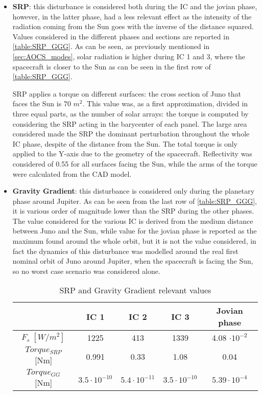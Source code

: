 \begin{itemize}
    \item \textbf{SRP}: this disturbance is considered both during the IC and the jovian phase, however, in the latter phase, had a less relevant effect as the intensity of the radiation coming from the Sun goes with the inverse of the distance squared. Values considered in the different phases and sections are reported in \autoref{table:SRP_GGG}. As can be seen, as previously mentioned in \autoref{sec:AOCS_modes}, solar radiation is higher during IC 1 and 3, where the spacecraft is closer to the Sun as can be seen in the first row of \autoref{table:SRP_GGG}. 
    
    SRP applies a torque on different surfaces: the cross section of Juno that faces the Sun is 70 $m^2$. This value was, as a first approximation, divided in three equal parts, as the number of solar arrays: the torque is computed by considering the SRP acting in the barycenter of each panel. The large area considered made the SRP the dominant perturbation throughout the whole IC phase, despite of the distance from the Sun. The total torque is only applied to the Y-axis due to the geometry of the spacecraft. Reflectivity was considered of 0.55 for all surfaces facing the Sun, while the arms of the torque were calculated from the CAD model. 

    \item \textbf{Gravity Gradient}: this disturbance is considered only during the planetary phase around Jupiter. As can be seen from the last row of \autoref{table:SRP_GGG}, it is various order of magnitude lower than the SRP during the other phases. The value considered for the various IC is derived from the medium distance between Juno and the Sun, while value for the jovian phase is reported as the maximum found around the whole orbit, but it is not the value considered, in fact the dynamics of this disturbance was modelled around the real first nominal orbit of Juno around Jupiter, when the spacecraft is facing the Sun, so no worst case scenario was considered alone.   %
    
    \begin{table}[H]
        \renewcommand{\arraystretch}{1.3}
        \centering
        \begin{tabular}{|c|c|c|c|c|}
            \hline
            &\textbf{IC 1} & \textbf{IC 2} & \textbf{IC 3} & \textbf{Jovian phase} \\
            \hline
            \hline
            $F_{s} \; [W/m^2]$ & 1225 & 413 & 1339 & 4.08 $\cdot 10^{-2}$ \\
            \hline
            $Torque_{SRP}$ [Nm] & 0.991 & 0.33 & 1.08 & 0.04 \\
            \hline
             $Torque_{GG}$ [Nm] & $3.5 \cdot 10^{-10}$ & $5.4 \cdot 10^{-11}$ & $3.5 \cdot 10^{-10}$ & $5.39 \cdot 10^{-4}$ \\
            \hline
        \end{tabular}
        \caption{SRP and Gravity Gradient relevant values}
        \label{table:SRP_GGG}
    \end{table}
    

\end{itemize}
